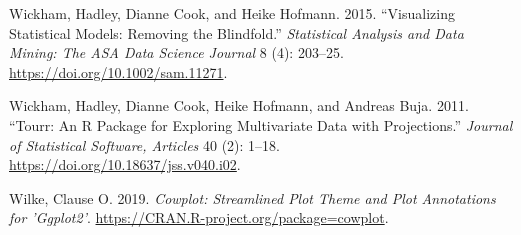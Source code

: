 \documentclass[article,notitle]{jdssv}
\begin{document}
\leavevmode\hypertarget{ref-Wickham2015-cx}{}%
Wickham, Hadley, Dianne Cook, and Heike Hofmann. 2015. ``Visualizing Statistical Models: Removing the Blindfold.'' \emph{Statistical Analysis and Data Mining: The ASA Data Science Journal} 8 (4): 203--25. \url{https://doi.org/10.1002/sam.11271}.

\leavevmode\hypertarget{ref-Wickham2011-st}{}%
Wickham, Hadley, Dianne Cook, Heike Hofmann, and Andreas Buja. 2011. ``Tourr: An R Package for Exploring Multivariate Data with Projections.'' \emph{Journal of Statistical Software, Articles} 40 (2): 1--18. \url{https://doi.org/10.18637/jss.v040.i02}.

\leavevmode\hypertarget{ref-r-cowplot}{}%
Wilke, Clause O. 2019. \emph{Cowplot: Streamlined Plot Theme and Plot Annotations for 'Ggplot2'}. \url{https://CRAN.R-project.org/package=cowplot}.
\end{document}
